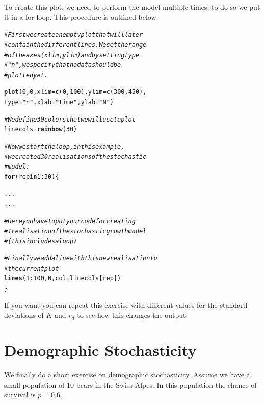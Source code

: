 \documentclass{article}\usepackage[]{graphicx}\usepackage[]{color}
\makeatletter
\newcommand{\hlnum}[1]{\textcolor[rgb]{0.686,0.059,0.569}{#1}}%
\newcommand{\hlstr}[1]{\textcolor[rgb]{0.192,0.494,0.8}{#1}}%
\newcommand{\hlcom}[1]{\textcolor[rgb]{0.678,0.584,0.686}{\textit{#1}}}%
\newcommand{\hlopt}[1]{\textcolor[rgb]{0,0,0}{#1}}%
\newcommand{\hlstd}[1]{\textcolor[rgb]{0.345,0.345,0.345}{#1}}%
\newcommand{\hlkwa}[1]{\textcolor[rgb]{0.161,0.373,0.58}{\textbf{#1}}}%
\newcommand{\hlkwb}[1]{\textcolor[rgb]{0.69,0.353,0.396}{#1}}%
\newcommand{\hlkwc}[1]{\textcolor[rgb]{0.333,0.667,0.333}{#1}}%
\newcommand{\hlkwd}[1]{\textcolor[rgb]{0.737,0.353,0.396}{\textbf{#1}}}%
\newenvironment{kframe}{%
 \def\at@end@of@kframe{}%
 \ifinner\ifhmode%
  \def\at@end@of@kframe{\end{minipage}}%
  \begin{minipage}{\columnwidth}%
 \fi\fi%
 \def\FrameCommand##1{\hskip\@totalleftmargin \hskip-\fboxsep
 \colorbox{shadecolor}{##1}\hskip-\fboxsep
     \hskip-\linewidth \hskip-\@totalleftmargin \hskip\columnwidth}%
 \MakeFramed {\advance\hsize-\width
   \@totalleftmargin\z@ \linewidth\hsize
   \@setminipage}}%
 {\par\unskip\endMakeFramed%
 \at@end@of@kframe}
\newenvironment{knitrout}{}{} %
\makeatother
\begin{document}
To create this plot, we need to perform the model multiple times: to do so we put it in a for-loop. This procedure is outlined below:
\begin{knitrout}
\color{fgcolor}\begin{kframe}
\begin{alltt}
\hlcom{# First we create an empty plot that will later}
\hlcom{# contain the different lines. We set the range}
\hlcom{# of the axes (xlim,ylim) and by setting type=}
\hlcom{# "n", we specify that no data should be}
\hlcom{# plotted yet.}

\hlkwd{plot}\hlstd{(}\hlnum{0}\hlstd{,}\hlnum{0}\hlstd{,}\hlkwc{xlim}\hlstd{=}\hlkwd{c}\hlstd{(}\hlnum{0}\hlstd{,}\hlnum{100}\hlstd{),}\hlkwc{ylim}\hlstd{=}\hlkwd{c}\hlstd{(}\hlnum{300}\hlstd{,}\hlnum{450}\hlstd{),}
     \hlkwc{type}\hlstd{=}\hlstr{"n"}\hlstd{,}\hlkwc{xlab}\hlstd{=}\hlstr{"time"}\hlstd{,}\hlkwc{ylab}\hlstd{=}\hlstr{"N"}\hlstd{)}

\hlcom{# We define 30 colors that we will use to plot}
\hlstd{linecols}\hlkwb{=}\hlkwd{rainbow}\hlstd{(}\hlnum{30}\hlstd{)}

\hlcom{# Now we start the loop, in this example,}
\hlcom{# we created 30 realisations of the stochastic}
\hlcom{# model:}
\hlkwa{for}\hlstd{(rep} \hlkwa{in} \hlnum{1}\hlopt{:}\hlnum{30}\hlstd{)\{}

  \hlstd{...}
  \hlstd{...}

  \hlcom{# Here you have to put your code for creating}
  \hlcom{# 1 realisation of the stochastic growth model}
  \hlcom{# (this includes a loop)}

  \hlcom{# Finally we add a line with this new realisation to}
  \hlcom{# the current plot}
  \hlkwd{lines}\hlstd{(}\hlnum{1}\hlopt{:}\hlnum{100}\hlstd{,N,}\hlkwc{col}\hlstd{=linecols[rep])}
\hlstd{\}}
\end{alltt}
\end{kframe}
\end{knitrout}
If you want you can repeat this exercise with different values for the standard deviations of $K$ and $r_d$ to see how this changes the output.

\section{Demographic Stochasticity}
We finally do a short exercise on demographic stochasticity. Assume we have a small population of $10$ bears in the Swiss Alpes. In this population the chance of survival is $p=0.6$.
\vspace{1.5ex}
\end{document}
